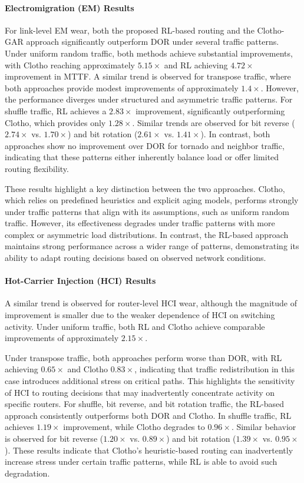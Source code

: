 \paragraph{Electromigration (EM) Results}

For link-level EM wear, both the proposed RL-based routing and the Clotho-GAR approach significantly outperform DOR under several traffic patterns. Under uniform random traffic, both methods achieve substantial improvements, with Clotho reaching approximately $5.15\times$ and RL achieving $4.72\times$ improvement in MTTF. A similar trend is observed for transpose traffic, where both approaches provide modest improvements of approximately $1.4\times$. However, the performance diverges under structured and asymmetric traffic patterns. For shuffle traffic, RL achieves a $2.83\times$ improvement, significantly outperforming Clotho, which provides only $1.28\times$. Similar trends are observed for bit reverse ($2.74\times$ vs. $1.70\times$) and bit rotation ($2.61\times$ vs. $1.41\times$). In contrast, both approaches show no improvement over DOR for tornado and neighbor traffic, indicating that these patterns either inherently balance load or offer limited routing flexibility.

These results highlight a key distinction between the two approaches. Clotho, which relies on predefined heuristics and explicit aging models, performs strongly under traffic patterns that align with its assumptions, such as uniform random traffic. However, its effectiveness degrades under traffic patterns with more complex or asymmetric load distributions. In contrast, the RL-based approach maintains strong performance across a wider range of patterns, demonstrating its ability to adapt routing decisions based on observed network conditions.

\paragraph{Hot-Carrier Injection (HCI) Results}

A similar trend is observed for router-level HCI wear, although the magnitude of improvement is smaller due to the weaker dependence of HCI on switching activity. Under uniform traffic, both RL and Clotho achieve comparable improvements of approximately $2.15\times$.

Under transpose traffic, both approaches perform worse than DOR, with RL achieving $0.65\times$ and Clotho $0.83\times$, indicating that traffic redistribution in this case introduces additional stress on critical paths. This highlights the sensitivity of HCI to routing decisions that may inadvertently concentrate activity on specific routers. For shuffle, bit reverse, and bit rotation traffic, the RL-based approach consistently outperforms both DOR and Clotho. In shuffle traffic, RL achieves $1.19\times$ improvement, while Clotho degrades to $0.96\times$. Similar behavior is observed for bit reverse ($1.20\times$ vs. $0.89\times$) and bit rotation ($1.39\times$ vs. $0.95\times$). These results indicate that Clotho's heuristic-based routing can inadvertently increase stress under certain traffic patterns, while RL is able to avoid such degradation.


